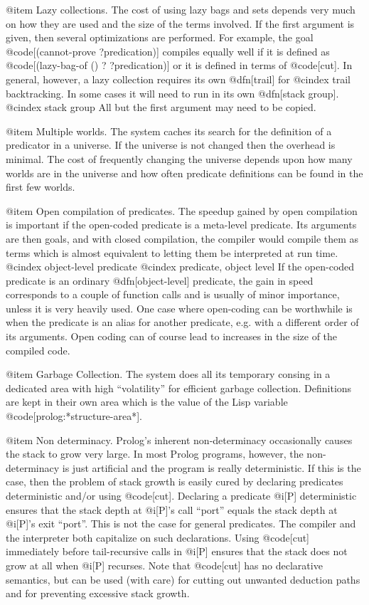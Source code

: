 {@item Lazy collections.
The cost of using lazy bags and sets depends very much on how they are used and
the size of the terms involved.
If the first argument is given, then several optimizations are performed.
For example, the goal @code[(cannot-prove ?predication)]
compiles equally
well if it is defined as @code[(lazy-bag-of () ? ?predication)]
or it is defined in terms of @code[cut].
In general, however, a lazy collection requires its own @dfn[trail] for
@cindex trail
backtracking.
In some cases it will need to run in its own @dfn[stack group].
@cindex stack group
All but the first argument may need to be copied.

@item Multiple worlds.
The system caches its search for the definition of a predicator in a universe.
If the universe is not changed then the overhead is minimal.
The cost of frequently changing the universe depends upon how many worlds are
in the universe and how often predicate definitions can be found in the first
few worlds.

@item Open compilation of predicates.
The speedup gained by open compilation is important if the open-coded
predicate is a meta-level predicate. Its arguments are then goals,
and with closed compilation, the compiler would compile them as terms
which is almost equivalent to letting them be interpreted at run time.
@cindex object-level predicate
@cindex predicate, object level
If the open-coded predicate is an ordinary @dfn[object-level] predicate,
the gain in speed corresponds to a couple of function calls and is
usually of minor importance, unless it is very heavily used.  One case 
where open-coding can be worthwhile
is when the predicate is an alias for another predicate, e.g. with a different
order of its arguments.
Open coding can of course lead to increases in the size of the compiled code.

@item Garbage Collection.
The system does all its temporary consing in a dedicated area with
high ``volatility'' for efficient garbage collection.  Definitions are
kept in their own area which is the value of the Lisp variable
@code[prolog:*structure-area*].


@item Non determinacy.
Prolog's inherent non-determinacy occasionally causes the stack to grow very
large.  In most Prolog programs, however, the non-determinacy is just
artificial and the program is really deterministic.
If this is the case, then the problem of stack growth is easily cured by
declaring predicates deterministic and/or using @code[cut].
Declaring a predicate @i[P] deterministic ensures that the stack depth at
@i[P]'s call ``port'' equals the stack depth at @i[P]'s exit ``port''.
This is not the case for general predicates.
The compiler and the interpreter both capitalize on such declarations.
Using @code[cut] immediately before tail-recursive calls in @i[P] ensures that 
the stack does not grow at all when @i[P] recurses. Note that @code[cut]
has no declarative semantics, but can be used (with care) for cutting out 
unwanted deduction paths and for preventing excessive stack growth.

}
